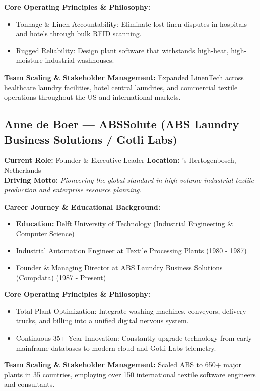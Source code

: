 \documentclass[11pt,a4paper]{article}
\begin{document}
\textbf{Core Operating Principles \& Philosophy:}
\begin{itemize}[leftmargin=*]
    \item Tonnage \& Linen Accountability: Eliminate lost linen disputes in hospitals and hotels through bulk RFID scanning.
    \item Rugged Reliability: Design plant software that withstands high-heat, high-moisture industrial washhouses.
\end{itemize}

\textbf{Team Scaling \& Stakeholder Management:} Expanded LinenTech across healthcare laundry facilities, hotel central laundries, and commercial textile operations throughout the US and international markets.

\subsection{Anne de Boer --- ABSSolute (ABS Laundry Business Solutions / Gotli Labs)}
\textbf{Current Role:} Founder \& Executive Leader \quad \textbf{Location:} ’s-Hertogenbosch, Netherlands\\
\textbf{Driving Motto:} \textit{Pioneering the global standard in high-volume industrial textile production and enterprise resource planning.}

\textbf{Career Journey \& Educational Background:}
\begin{itemize}[leftmargin=*]
    \item \textbf{Education:} Delft University of Technology (Industrial Engineering \& Computer Science)
    \item Industrial Automation Engineer at Textile Processing Plants (1980 - 1987)
    \item Founder \& Managing Director at ABS Laundry Business Solutions (Compdata) (1987 - Present)
\end{itemize}

\textbf{Core Operating Principles \& Philosophy:}
\begin{itemize}[leftmargin=*]
    \item Total Plant Optimization: Integrate washing machines, conveyors, delivery trucks, and billing into a unified digital nervous system.
    \item Continuous 35+ Year Innovation: Constantly upgrade technology from early mainframe databases to modern cloud and Gotli Labs telemetry.
\end{itemize}

\textbf{Team Scaling \& Stakeholder Management:} Scaled ABS to 650+ major plants in 35 countries, employing over 150 international textile software engineers and consultants.
\end{document}
